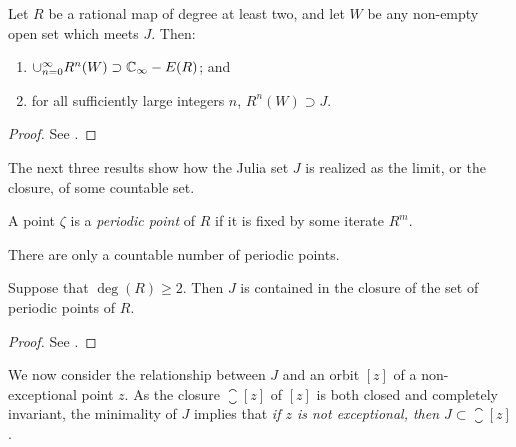 \begin{theorem}
    \label{thm:union_of_iterates_of_an_open_set_that_meet_J_explode_to_ExtC_minus_exceptional_points}
    Let $R$ be a rational map of degree at least two, and let $W$ be any
    non-empty open set which meets $J$. Then:
    \begin{enumerate}[label=(\roman*)]
        \item $\cup_{n=0}^\infty R^n(W) \supset \mathbb{C}_\infty - E(R)$; and
        \item for all sufficiently large integers $n$, $R^n(W) \supset J$.
    \end{enumerate}
\end{theorem}
\begin{proof}
    See \cite[69]{Beardon1991}.
\end{proof}

The next three results show how the Julia set $J$ is realized as the limit, or
the closure, of some countable set.

\begin{definition}
    \label{def:periodic_point}
    A point $\zeta$ is a \emph{periodic point} of $R$ if it is fixed by some
    iterate $R^m$.
\end{definition}

\begin{remark}
    There are only a countable number of periodic points.
\end{remark}

\begin{theorem}
    \label{thm:J_contained_in_closure_of_periodic_points_set}
    Suppose that $\deg(R) \geq 2$. Then $J$ is contained in the closure of the
    set of periodic points of $R$.
\end{theorem}
\begin{proof}
    See \cite[70--71]{Beardon1991}.
\end{proof}

\begin{remark} We
    now consider the relationship between $J$ and an orbit $[z]$ of a
    non-exceptional point $z$. As the closure $\closure{[z]}$ of $[z]$ is both
    closed and completely invariant, the minimality of $J$ implies that \emph{if
    $z$ is not exceptional, then $J \subset \closure{[z]}$}.
\end{remark}


